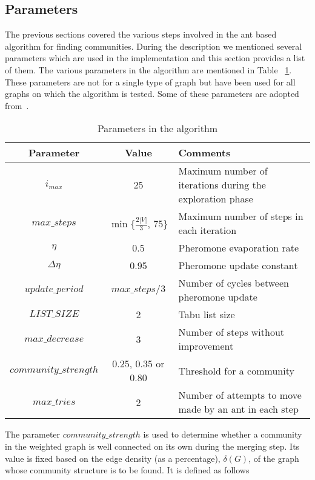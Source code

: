 \begin{spacing}{1.5}
\section{Parameters}

The previous sections covered the various steps involved in the ant based algorithm for finding communities. During the description we mentioned several parameters which are used in the implementation and this section provides a list of them. The various parameters in the algorithm are mentioned in Table ~\ref{tab1}. These parameters are not for a single type of graph but have been used for all graphs on which the algorithm is tested. Some of these parameters are adopted from~\cite{5910378}.\\
\begin{table}
\caption{Parameters in the algorithm}
\scriptsize
\BlankLine
\begin{tabular}{ | c | c | l | }
	\hline
	\textbf{Parameter} & \textbf{Value} & \textbf{Comments}\xtra\\
	\hline
	$i_{max}$ & 25 & Maximum number of iterations during the exploration phase\xtra\\
	\hline
	$max\_steps$ & $\min\{\frac{2|V|}{3}$, 75\} & Maximum number of steps in each iteration\xtra\\
	\hline
	$\eta$ & 0.5 & Pheromone evaporation rate \xtra\\
	\hline
	$\Delta\eta$ & 0.95 & Pheromone update constant \xtra\\
	\hline
	$update\_period$ & $max\_steps / 3$ & Number of cycles between pheromone update \xtra\\
	\hline
	$LIST\_SIZE$ & 2 & Tabu list size\xtra\\
	\hline
	$max\_decrease$ & 3 & Number of steps without improvement\xtra\\
	\hline
	$community\_strength$ & 0.25, 0.35 or 0.80 & Threshold for a community\xtra\\
	\hline
	$max\_tries$ & 2 & Number of attempts to move made by an ant in each step\xtra\\
	\hline
\end{tabular}
\label{tab1}
\end{table}
\indent The parameter $community\_strength$ is used to determine whether a community in the weighted graph is well connected on its own during the merging step. Its value is fixed based on the edge density (as a percentage), $\delta(G)$, of the graph whose community structure is to be found. It is defined as follows
\begin{equation}

\end{equation}
\end{spacing}
